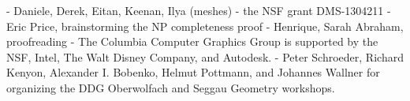 \begin{acks}
- Daniele, Derek, Eitan, Keenan, Ilya (meshes)
- the NSF grant DMS-1304211
- Eric Price, brainstorming the NP completeness proof
- Henrique, Sarah Abraham, proofreading
- The Columbia Computer Graphics Group is supported by the NSF, Intel, The Walt
  Disney Company, and Autodesk.
- Peter Schroeder, Richard Kenyon, Alexander I. Bobenko, Helmut Pottmann, and
  Johannes Wallner for organizing the DDG Oberwolfach and Seggau Geometry
  workshops.
\end{acks}
